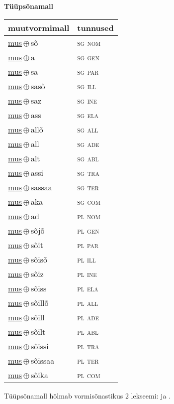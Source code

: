 

\vspace{3.5em}
\noindent \begin{minipage}{\textwidth}
\noindent \textbf{Tüüpsõnamall \,}\\

\begin{sideways}
\begin{tabular}{l l}
muutvormimall & tunnused \\
\hline
\underline{mus}\,$\oplus$\,sõ & \textsc{ sg nom } \\
\underline{mus}\,$\oplus$\,a & \textsc{ sg gen } \\
\underline{mus}\,$\oplus$\,sa & \textsc{ sg par } \\
\underline{mus}\,$\oplus$\,sasõ & \textsc{ sg ill } \\
\underline{mus}\,$\oplus$\,saz & \textsc{ sg ine } \\
\underline{mus}\,$\oplus$\,ass & \textsc{ sg ela } \\
\underline{mus}\,$\oplus$\,allõ & \textsc{ sg all } \\
\underline{mus}\,$\oplus$\,all & \textsc{ sg ade } \\
\underline{mus}\,$\oplus$\,alt & \textsc{ sg abl } \\
\underline{mus}\,$\oplus$\,assi & \textsc{ sg tra } \\
\underline{mus}\,$\oplus$\,sassaa & \textsc{ sg ter } \\
\underline{mus}\,$\oplus$\,aka & \textsc{ sg com } \\
\underline{mus}\,$\oplus$\,ad & \textsc{ pl nom } \\
\underline{mus}\,$\oplus$\,sõjõ & \textsc{ pl gen } \\
\underline{mus}\,$\oplus$\,sõit & \textsc{ pl par } \\
\underline{mus}\,$\oplus$\,sõisõ & \textsc{ pl ill } \\
\underline{mus}\,$\oplus$\,sõiz & \textsc{ pl ine } \\
\underline{mus}\,$\oplus$\,sõiss & \textsc{ pl ela } \\
\underline{mus}\,$\oplus$\,sõillõ & \textsc{ pl all } \\
\underline{mus}\,$\oplus$\,sõill & \textsc{ pl ade } \\
\underline{mus}\,$\oplus$\,sõilt & \textsc{ pl abl } \\
\underline{mus}\,$\oplus$\,sõissi & \textsc{ pl tra } \\
\underline{mus}\,$\oplus$\,sõissaa & \textsc{ pl ter } \\
\underline{mus}\,$\oplus$\,sõika & \textsc{ pl com } \\
\end{tabular}
\end{sideways}
\label{tab:tüüpsõnamall-mussõ}

\end{minipage}

 
\vspace{1em}
\noindent Tüüpsõnamall  hõlmab vormisõnastikus 2 lekseemi:  ja .
